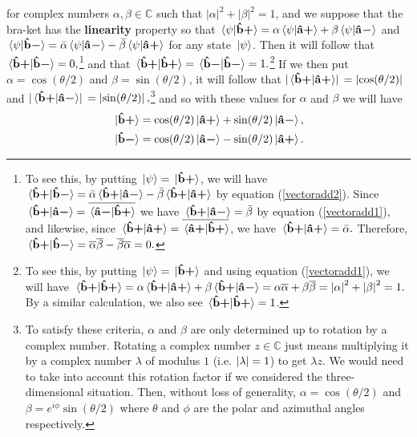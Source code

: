 for complex numbers $\alpha, \beta \in \mathbb{C}$ such that $|\alpha|^2+|\beta|^2=1$, and we suppose that the bra-ket has the \textbf{linearity}\label{linearity} property so that  $\ip*{\psi}{\uvbp{b}}=\alpha\ip*{\psi}{\uvbp{a}}+\beta\ip*{\psi}{\uvbm{a}}$ and $\ip*{\psi}{\uvbm{b}}=\bar{\alpha}\ip*{\psi}{\uvbm{a}}-\bar{\beta}\ip*{\psi}{\uvbp{a}}$ for any state $\ket*{\psi}$. Then  it will follow that  $\ip*{\uvbp{b}}{\uvbm{b}}=0,$\footnote{To see this, by putting $\ket*{\psi}=\ket*{{\vb{\hat{{b}}}\bm{+}}}$, we will have $\ip*{\uvbp{b}}{\uvbm{b}}=\bar{\alpha}\ip*{\uvbp{b}}{\uvbm{a}}-\bar{\beta}\ip*{\uvbp{b}}{\uvbp{a}}$ by equation (\ref{vectoradd2}). Since  $\ip*{\uvbp{b}}{\uvbm{a}}=\overline{\ip*{\uvbm{a}}{\uvbp{b}}}$ we have $\ip*{\uvbp{b}}{\uvbm{a}}=\bar{\beta}$ by equation (\ref{vectoradd1}), and likewise, since $\ip*{\uvbp{b}}{\uvbp{a}}=\overline{\ip*{\uvbp{a}}{\uvbp{b}}}$, we have $\ip*{\uvbp{b}}{\uvbp{a}}=\bar{\alpha}.$  Therefore,  $\ip*{\uvbp{b}}{\uvbm{b}}=\overline{\alpha}\overline{\beta}-\overline{\beta}{\overline{\alpha}}=0.$}  and that $\ip*{\uvbp{b}}{\uvbp{b}}=\ip*{\uvbm{b}}{\uvbm{b}} = 1.$\footnote{To see this, by putting $\ket*{\psi}=\ket*{{\vb{\hat{{b}}}\bm{+}}}$ and using equation (\ref{vectoradd1}), we will have $\ip*{\uvbp{b}}{\uvbp{b}}=\alpha\ip*{\uvbp{b}}{\uvbp{a}}+\beta\ip*{\uvbp{b}}{\uvbm{a}}=\alpha\overline{\alpha}+\beta\overline{\beta}=\abs{\alpha}^2+\abs{\beta}^2=1.$ By a similar calculation, we also see $\ip*{\uvbp{b}}{\uvbp{b}}=1$.}  
If we then put  $\alpha=\cos(\theta/2)$ and $\beta=\sin(\theta/2)$, it will follow that $\abs*{\ip*{\uvbp{b}}{\uvbp{a}}}=\abs*{\cos(\theta/2)}$ and  $\abs*{\ip*{\uvbp{b}}{\uvbm{a}}}=\abs*{\sin(\theta/2)},$\footnote{To satisfy these criteria, $\alpha$ and $\beta$ are only determined up to rotation by a complex number. Rotating a complex number $z\in\mathbb{C}$ just means multiplying it by a complex number $\lambda$ of modulus $1$ (i.e. $\abs{\lambda}=1$) to get $\lambda z$. We would need to take into account this rotation factor if we considered the three-dimensional situation. Then, without loss of generality, $\alpha=\cos(\theta/2)$ and $\beta=e^{i\phi}\sin(\theta/2)$ where $\theta$ and $\phi$ are the polar and azimuthal angles respectively.} and so with these values for $\alpha$ and $\beta$ we will have
\begin{subequations}\label{spintrans}
\begin{align}
\ket*{{\vb{\hat{{b}}}\bm{+}}}&= \cos(\theta/2)\ket*{{\vb{\hat{{a}}}\bm{+}}}+\sin(\theta/2) \ket*{{\vb{\hat{{a}}}\bm{-}}},\label{spintrans1}\\
\ket*{{\vb{\hat{{b}}}\bm{-}}}&= \cos(\theta/2)\ket*{{\vb{\hat{{a}}}\bm{-}}}-\sin(\theta/2) \ket*{{\vb{\hat{{a}}}\bm{+}}}.\label{spintrans2}
\end{align}
\end{subequations}